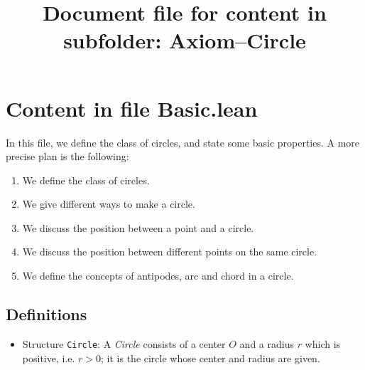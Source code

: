 \documentclass[12pt]{amsart}
\title{Document file for content in subfolder: Axiom--Circle}
\begin{document}
\maketitle

\section{Content in file Basic.lean}
In this file, we define the class of circles, and state some basic properties. A more precise plan is the following:
\begin{enumerate}
    \item We define the class of circles.
    \item We give different ways to make a circle.
    \item We discuss the position between a point and a circle.
    \item We discuss the position between different points on the same circle.
    \item We define the concepts of antipodes, arc and chord in a circle.
\end{enumerate}

\subsection{Definitions}
\begin{itemize}
    \item Structure \verb|Circle|: A \emph{Circle} consists of a center $O$ and a radius $r$ which is positive, i.e. $r > 0$; it is the circle whose center and radius are given.
\end{itemize}
\end{document}

